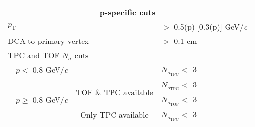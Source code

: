 \documentclass[ALICE,manyauthors]{cernphprep}
\newcommand{\Lam}{$\Lambda$\xspace}
\begin{document}
\begin{table}[htbp]
\begin{tabular}{lc|c|l}
   
   \multicolumn{4}{c}{\textbf{p-specific cuts}} \\
   \hline
   \multicolumn{3}{l|}{$p_{\mathrm{T}}$} & $ > $ 0.5(p) [0.3($\overline{\mathrm{p}}$)] GeV/\textit{c} \\
   \hline
   \multicolumn{3}{l|}{DCA to primary vertex} & $>$ 0.1 cm \\
   \hline
   \multicolumn{4}{l}{TPC and TOF $N_{\sigma}$ cuts} \\
   \cline{2-4}
    & \multicolumn{1}{c}{$p <$ 0.8 GeV/\textit{c}} & & $N_{\sigma_{\mathrm{TPC}}} <$ 3 \\
   \cline{2-4}
    & \multicolumn{1}{c}{\multirow{3}{*}{$p \geq$ 0.8 GeV/\textit{c}}} &  \multirow{2}{*}{TOF \& TPC available} & $N_{\sigma_{\mathrm{TPC}}} <$ 3 \\
    & \multicolumn{2}{c|}{} & $N_{\sigma_{\mathrm{TOF}}} <$ 3 \\
   \cline{3-4}
    & \multicolumn{1}{c}{} & Only TPC available & $N_{\sigma_{\mathrm{TPC}}} <$ 3 \\
   \hline   
  \end{tabular}
 \label{tab:LamCuts} 
\end{table}
\end{document}
